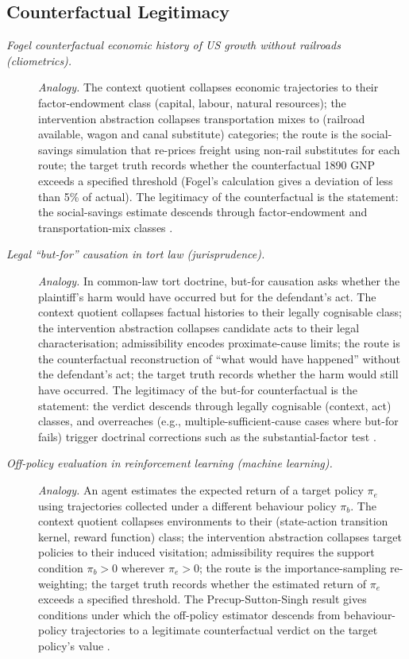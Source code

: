 \subsection*{ Counterfactual Legitimacy}
\begingroup\small
\begin{description}
\item[\emph{Fogel counterfactual economic history of US
growth without railroads (cliometrics).}] \textit{Analogy.}
The context quotient collapses economic trajectories
to their factor-endowment class (capital, labour,
natural resources); the intervention abstraction
collapses transportation mixes to (railroad available,
wagon and canal substitute) categories; the route is
the social-savings simulation that re-prices freight
using non-rail substitutes for each route; the target
truth records whether the counterfactual 1890 GNP
exceeds a specified threshold (Fogel's calculation
gives a deviation of less than 5\% of actual).  The
legitimacy of the counterfactual is the  statement:
the social-savings estimate descends through
factor-endowment and transportation-mix classes
\citep{Fogel1964RailroadsAmericanGrowth}.

\item[\emph{Legal ``but-for'' causation in tort law
(jurisprudence).}] \textit{Analogy.}
In common-law tort doctrine, but-for causation asks
whether the plaintiff's harm would have occurred but
for the defendant's act.  The context quotient
collapses factual histories to their legally cognisable
class; the intervention abstraction collapses
candidate acts to their legal characterisation;
admissibility encodes proximate-cause limits; the
route is the counterfactual reconstruction of ``what
would have happened'' without the defendant's act; the
target truth records whether the harm would still have
occurred.  The legitimacy of the but-for
counterfactual is the  statement: the verdict
descends through legally cognisable
(context, act) classes, and overreaches (e.g.,
multiple-sufficient-cause cases where but-for fails)
trigger
doctrinal corrections such as the substantial-factor
test \citep{HartHonore1985Causation}.

\item[\emph{Off-policy evaluation in reinforcement
learning (machine learning).}] \textit{Analogy.}
An agent estimates the expected return of a target
policy \(\pi_e\) using trajectories collected under a
different behaviour policy \(\pi_b\).  The context
quotient collapses environments to their (state-action
transition kernel, reward function) class; the
intervention abstraction collapses target policies to
their induced visitation; admissibility requires the
support condition \(\pi_b>0\) wherever \(\pi_e>0\);
the route is the importance-sampling re-weighting; the
target truth records whether the estimated return of
\(\pi_e\) exceeds a specified threshold.  The
Precup-Sutton-Singh result gives conditions under
which the off-policy estimator descends from
behaviour-policy trajectories to a legitimate
counterfactual verdict on the target policy's value
\citep{PrecupSuttonSingh2000Eligibility}.


\end{description}
